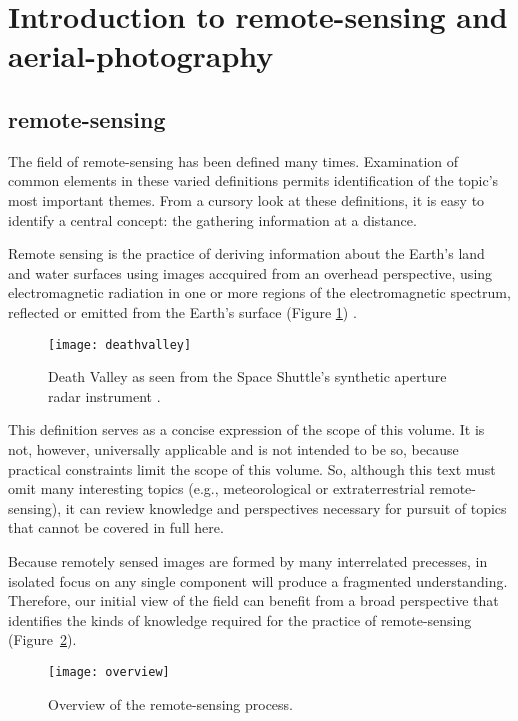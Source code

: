 \section{Introduction to \Gls{remote-sensing} and \Gls{aerial-photography}}
\subsection{\Gls{remote-sensing}}
The field of \gls{remote-sensing} has been defined many times. Examination of common
elements in these varied definitions permits identification of the topic's most
important themes. From a cursory look at these definitions, it is easy to
identify a central concept: the gathering information at a distance.


Remote sensing is the practice of deriving information about the Earth's land
and water surfaces using images accquired from an overhead perspective, using
electromagnetic radiation in one or more regions of the electromagnetic
spectrum, reflected or emitted from the Earth's surface (Figure
\ref{fig:deathvalley}) \cite{book:731838}.
\begin{figure}[h]
    \centering
    \texttt{[image: deathvalley]}
    \caption{Death Valley as seen from the Space Shuttle's synthetic aperture
    radar instrument \cite{deathvalley}.}
    \label{fig:deathvalley}
\end{figure}


This definition serves as a concise expression of the scope of this volume.
It is not, however, universally applicable and is not intended to be so,
because practical constraints limit the scope of this volume. So, although
this text must omit many interesting topics (e.g., meteorological or
extraterrestrial \gls{remote-sensing}), it can review knowledge and perspectives
necessary for pursuit of topics that cannot be covered in full here.


Because remotely sensed images are formed by many interrelated precesses,
in isolated focus on any single component will produce a fragmented
understanding. Therefore, our initial view of the field can benefit from
a broad perspective that identifies the kinds of knowledge required for
the practice of \gls{remote-sensing} (Figure~\ref{fig:overview}).
\begin{figure}[h]
    \centering
    \texttt{[image: overview]}
    \caption{Overview of the \gls{remote-sensing} process.}
    \label{fig:overview}
\end{figure}


